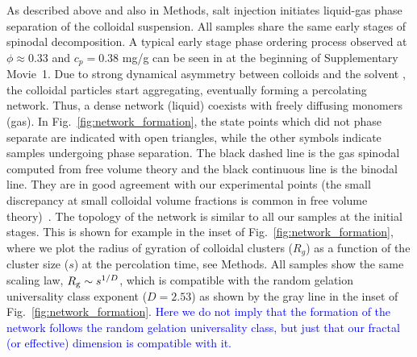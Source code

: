 \documentclass[preprint,amsmath,amssymb,superscriptaddress]{revtex4-1}
\begin{document}
As described above and also in Methods, salt injection initiates liquid-gas phase separation of the colloidal suspension. 
All samples share the same early stages of spinodal decomposition. 
A typical early stage phase ordering process observed at $\phi\approx 0.33$ and $c_p=0.38$ mg/g can be seen in at the beginning of Supplementary Movie~1.
Due to strong dynamical asymmetry between colloids and the solvent \cite{tanaka1999colloid}, the colloidal particles start aggregating, 
eventually forming a percolating network. Thus, a dense network (liquid) coexists with freely diffusing monomers (gas).
In Fig.~\ref{fig:network_formation}, the state points which did not phase separate are indicated with open triangles, while
the other symbols indicate samples undergoing phase separation. The black dashed line is the gas spinodal computed from free volume theory and the 
black continuous line is the binodal line. They are in good agreement with our experimental points (the small discrepancy at small colloidal volume fractions 
is common in free volume theory)~\cite{Royall2007,lu2008gelation}.
The topology of the network is similar to all our samples at the initial stages. 
This is shown for example in the inset of Fig.~\ref{fig:network_formation}, where we plot the radius of gyration of colloidal clusters ($R_g$)
as a function of the cluster size ($s$) at the percolation time, see Methods. All samples show the same scaling law, $R_{\rm g}\sim s^{1/D}$, which is compatible with
the random gelation universality class exponent ($D=2.53$) as shown by the gray line in the inset of Fig.~\ref{fig:network_formation}. \textcolor{blue}{Here we do not imply that the formation of the network follows the random gelation universality class, but just that our
fractal (or effective) dimension is compatible with it.}

\end{document}
